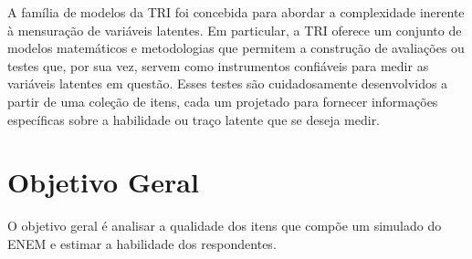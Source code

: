 \begin{comment}
A incorporação TRI na avaliação das habilidades dos alunos no ambiente escolar é uma prática que tem ganhado destaque devido à sua capacidade de fornecer medidas precisas e personalizadas das competências dos estudantes. é u em avaliações de escala nacional, estadual e municipal, exemplos como o Sistema de Avaliação de Rendimento Escolar do Estado de São Paulo (SARESP), o Sistema de Avaliação da Educação Básica (SAEB) e o Exame Nacional do Ensino Médio (ENEM). 
Com uma avaliação mais precisa e personalizada é possível a adaptação das estratégias de ensino e a identificação de áreas de melhoria no sistema educacional. 
\end{comment}


A família de modelos da TRI foi concebida para abordar a complexidade inerente à mensuração de variáveis latentes. Em particular, a TRI oferece um conjunto de modelos matemáticos e metodologias que permitem a construção de avaliações ou testes que, por sua vez, servem como instrumentos confiáveis para medir as variáveis latentes em questão. Esses testes são cuidadosamente desenvolvidos a partir de uma coleção de itens, cada um projetado para fornecer informações específicas sobre a habilidade ou traço latente que se deseja medir. \cite{pasquali2018}

  

\begin{comment}
	Além disso, ao utilizar modelos estatísticos sofisticados, a TRI é capaz de estimar as habilidades latentes dos alunos de forma mais precisa, levando em consideração a dificuldade dos itens e a capacidade discriminativa de cada questão. Dessa forma, a TRI oferece uma abordagem mais justa e confiável para avaliar o progresso dos alunos, fornecendo informações valiosas que podem ser usadas para direcionar o ensino, identificar alunos que precisam de apoio adicional e melhorar o currículo escolar. Consequentemente, a TRI desempenha um papel essencial na promoção de práticas educacionais eficazes e na melhoria contínua da qualidade da educação.
	
\end{comment}


\section{Objetivo Geral}

O objetivo geral é analisar a qualidade dos itens que compõe um simulado do ENEM e estimar a habilidade dos respondentes.

